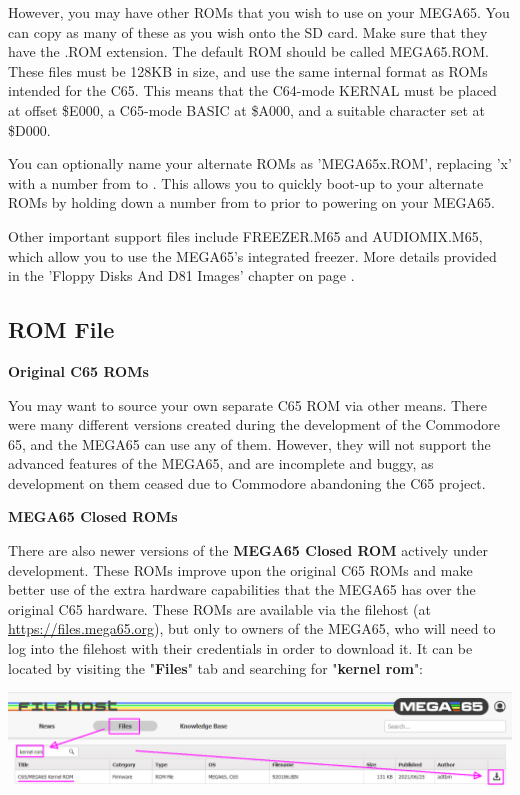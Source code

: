 However, you may have other ROMs that you wish to
use on your MEGA65.
You can copy as many of these as you wish onto the
SD card.  Make sure that they have the .ROM extension.  The default ROM
should be called MEGA65.ROM. These files
must be 128KB in size, and use the same internal format as ROMs
intended for the C65.  This means that the C64-mode KERNAL must be
placed at offset \$E000, a C65-mode BASIC at \$A000, and a suitable
character set at \$D000.

You can optionally name your alternate ROMs as 'MEGA65x.ROM', replacing 'x' with a number from  to .
This allows you to quickly boot-up to your alternate ROMs by holding down a number from  to  prior 
to powering on your MEGA65.

Other important support files include FREEZER.M65 and AUDIOMIX.M65, which
allow you to use the MEGA65's integrated freezer. More details provided in the 'Floppy Disks And D81 Images' 
chapter on page \pageref{cha:freezer}.

\subsection{ROM File}

\textbf{Original C65 ROMs}

You may want to source your own separate C65 ROM via other means.
There were many different versions created during the development of the Commodore 65,
and the MEGA65 can use any of them.  However, they will not support the advanced
features of the MEGA65, and are incomplete and buggy, as development on them ceased
due to Commodore abandoning the C65 project.

\textbf{MEGA65 Closed ROMs}

There are also newer versions of the \textbf{MEGA65 Closed ROM} actively under development. These ROMs improve upon the original C65 ROMs and make better use of the extra hardware capabilities that the MEGA65 has over the original C65 hardware. These ROMs are available via the filehost (at \url{https://files.mega65.org}), but only to owners of the MEGA65, who will need to log into the filehost with their credentials in order to download it. It can be located by visiting the "\textbf{Files}" tab and searching for "\textbf{kernel rom}":

\includegraphics[width=\linewidth]{images/latest_closed_rom.png}

